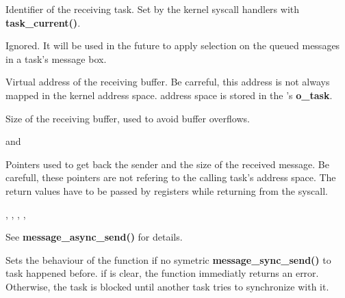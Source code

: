 \begin{itemize}
{	 \item {}

	   Identifier of the receiving task. Set by
	   the kernel syscall handlers with \textbf{task\_current()}.

	 \item {}

	   Ignored. It will be used in the future to
	   apply selection on the queued messages in a task's message box.

	 \item {}

	   Virtual address of the receiving
	   buffer. Be carreful, this address is not always mapped in the
	   kernel address space.  address space is stored in
	   the 's \textbf{o\_task}.

	 \item {}

	   Size of the receiving buffer, used to avoid buffer overflows.

	 \item {} and 
	   
	   Pointers used to
	   get back the sender and the size of the received message. Be carefull,
	   these pointers are not refering to the calling task's address space.
	   The return values have to be passed by registers while returning
	   from the syscall.
	 }

	 {
	   \item {}, , ,
	     , 

	     See \textbf{message\_async\_send()} for details.
	 }

	 {
	   \item {}

	     Sets the behaviour of the function if no symetric
	     \textbf{message\_sync\_send()} to task 
	     happened before. if  is clear, the function
	     immediatly returns an error. Otherwise, the task
	      is blocked until another task tries to
	     synchronize with it.

}
\end{itemize}
